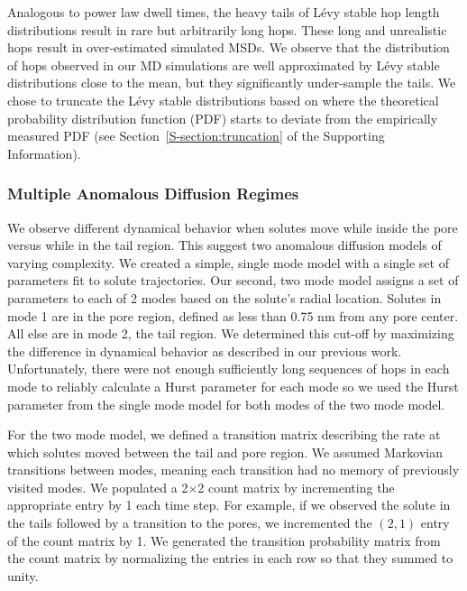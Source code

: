 \documentclass{article}
\begin{document}
  Analogous to power law dwell times, the heavy tails of L\'evy stable 
  hop length distributions result in rare but arbitrarily long hops. These long
  and unrealistic hops result in over-estimated simulated MSDs. We observe that
  the distribution of hops observed in our MD simulations are well approximated 
  by L\'evy stable distributions close to the mean, but they significantly under-sample
  the tails. We chose to truncate the L\'evy stable distributions based
  on where the theoretical probability distribution function (PDF) starts to 
  deviate from the empirically measured PDF (see Section~\ref{S-section:truncation}
  of the Supporting Information).~\cite{mantegna_stochastic_1994}

  \subsubsection*{Multiple Anomalous Diffusion Regimes}
  
  We observe different dynamical behavior when solutes move while inside 
  the pore versus while in the tail region. This suggest two anomalous diffusion 
  models of varying complexity. We created a simple, single mode model with a single 
  set of parameters fit to solute trajectories.
  Our second, two mode model assigns a set of parameters to each of 2 modes based
  on the solute's radial location. Solutes in mode 1 are in the pore region, defined
  as less than 0.75 nm from any pore center. All else are in mode 2, the tail region. 
  We determined this cut-off by maximizing the difference in dynamical behavior as 
  described in our previous work.~\cite{coscia_chemically_2019} Unfortunately, 
  there were not enough sufficiently long sequences of hops in each mode to reliably
  calculate a Hurst parameter for each mode so we used the Hurst parameter from the 
  single mode model for both modes of the two mode model.
  
 
  For the two mode model, we defined a transition matrix describing the rate at
  which solutes moved between the tail and pore region. We assumed Markovian transitions
  between modes, meaning each transition had no memory of previously visited modes. 
  We populated a 2$\times$2 count matrix by incrementing the appropriate entry by 1 each time step. 
  For example, if we observed the solute in the tails followed by a transition to 
  the pores, we incremented the $(2, 1)$ entry of the count matrix by 1. We generated
  the transition probability matrix from the count matrix by normalizing the 
  entries in each row so that they summed to unity.
 
\end{document}

